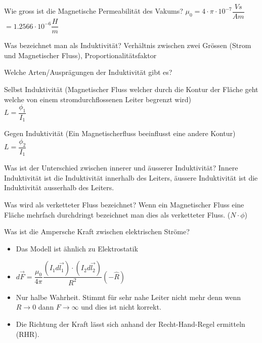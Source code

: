 
\begin{lk}{Wie gross ist die Magnetische Permeabilität des Vakums?}
	\LARGE{$ \mu_0 = 4 \cdot \pi \cdot 10^{-7} \dfrac{Vs}{Am} $ \\[12pt] $ = 1.2566  \cdot 10^{-6} \dfrac{H}{m}$}
\end{lk}

\begin{lk}{Was bezeichnet man als Induktivität?}
	Verhältnis zwischen zwei Grössen (Strom und Magnetischer Fluss), Proportionalitätsfaktor\\[12pt]
\end{lk}

\begin{lk}{Welche Arten/Ausprägungen der Induktivität gibt es?}
	\begin{compactitem}
		\item Selbst Induktivität (Magnetischer Fluss welcher durch die Kontur der Fläche geht welche von einem stromdurchflossenen Leiter begrenzt wird)\\
		$ L = \dfrac{\phi_1}{I_1} $
		\item Gegen Induktivität (Ein Magnetischerfluss beeinflusst eine andere Kontur)\\
		$ L = \dfrac{\phi_2}{I_1} $
	\end{compactitem}
\end{lk}

\begin{lk}{Was ist der Unterschied zwischen innerer und äusserer Induktivität?}
	Innere Induktivität ist die Induktivität innerhalb des Leiters, äussere Induktivität ist die Induktivität ausserhalb des Leiters.
\end{lk}

\begin{lk}{Was wird als verketteter Fluss bezeichnet?}
	Wenn ein Magnetischer Fluss eine Fläche mehrfach durchdringt bezeichnet man dies als verketteter Fluss. ($ N \cdot \phi $)
\end{lk}

\begin{karte}{Was ist die Ampersche Kraft zwischen elektrischen Ströme?}
	\begin{itemize}
		\item Das Modell ist ähnlich zu Elektrostatik
		\item $d \vec{F}=\dfrac{\mu_{0}}{4 \pi} \dfrac{\left(I_{1} d \vec{l_{1}}\right) \cdot\left(I_{2} d \vec{l_{2}}\right)}{R^{2}}(-\hat{R})$
		\item Nur halbe Wahrheit. Stimmt für sehr nahe Leiter nicht mehr denn wenn $R \rightarrow 0$ dann $ F \rightarrow \infty$ und dies ist nicht korrekt.
		\item Die Richtung der Kraft lässt sich anhand der Recht-Hand-Regel ermitteln (RHR).
	\end{itemize}
\end{karte}

